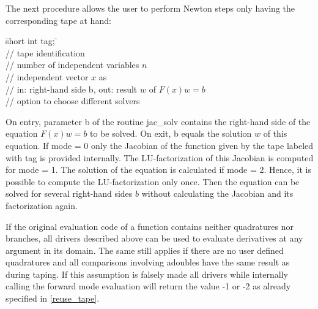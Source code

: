 \documentclass[11pt,twoside]{article}
\begin{document}
%
The next procedure allows the user to perform Newton steps only 
having the corresponding tape at hand: 
%
\begin{tabbing}
\hspace{0.5in}\={\sf short int tag;} \hspace{1.1in}\= \kill    %
 \\
         \> // tape identification \\
                 \> // number of independent variables $n$\\
           \> // independent vector $x$ as\\
           \> // in: right-hand side b, out: result $w$ of
$F(x)w = b$\\
              \> // option to choose different solvers
\end{tabbing}
%
On entry, parameter {\sf b} of the routine {\sf jac\_solv}
contains the right-hand side of the equation $F(x)w = b$ to be solved. On exit, 
{\sf b} equals the solution $w$ of this equation. If {\sf mode} = 0 only 
the Jacobian of the function
given by the tape labeled with {\sf tag} is provided internally.
The LU-factorization of this Jacobian is computed for {\sf mode} = 1. The 
solution of the equation is calculated if {\sf mode} = 2.
Hence, it is possible to compute the 
LU-factorization only once. Then the equation can be solved for several
right-hand sides $b$ without calculating the Jacobian and
its factorization again.  

If the original evaluation code of a function contains neither
quadratures nor branches, all drivers described above can be used to
evaluate derivatives at any argument in its domain. The same still 
applies if there are no user defined quadratures and
all comparisons  involving {\sf adouble}s have the same result as
during taping. If this assumption is falsely made all drivers
while internally calling the forward mode evaluation will return the value -1 or -2 
as already specified in \autoref{reuse_tape}.  

%
\end{document}
